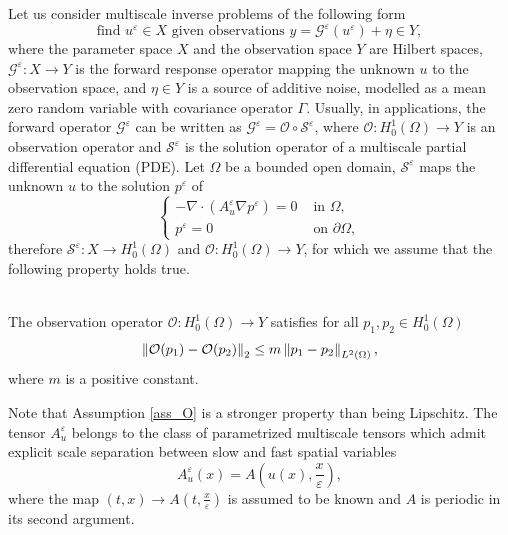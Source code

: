 \documentclass[10pt]{article}
\begin{document}
Let us consider multiscale inverse problems of the following form
\begin{equation}
\label{multiscale_inverse_problem}
\text{find } u^{\varepsilon} \in X \text{ given observations } y = \mathcal{G}^{\varepsilon}(u^{\varepsilon}) + \eta \in Y,
\end{equation}
where the parameter space $X$ and the observation space $Y$ are Hilbert spaces, $\mathcal{G}^{\varepsilon} \colon X \to Y$ is the forward response operator mapping the unknown $u$ to the observation space, and $\eta \in Y$ is a source of additive noise, modelled as a mean zero random variable with covariance operator $\Gamma$. Usually, in applications, the forward operator $\mathcal{G}^{\varepsilon}$ can be written as $\mathcal{G}^{\varepsilon} = \mathcal{O} \circ \mathcal{S}^{\varepsilon}$, where $\mathcal{O} \colon H^1_0(\Omega) \to Y$ is an observation operator and $\mathcal{S}^{\varepsilon}$ is the solution operator of a multiscale partial differential equation (PDE). Let $\Omega$ be a bounded open domain, $\mathcal{S}^{\varepsilon}$ maps the unknown $u$ to the solution $p^{\varepsilon}$ of 
\begin{equation}
\label{intro_problem_multiscale}
\begin{cases}
- \nabla \cdot ( A^{\varepsilon}_u \nabla p^{\varepsilon} ) = 0 & \text{ in } \Omega, \\
p^{\varepsilon} = 0 & \text{ on } \partial \Omega,
\end{cases}
\end{equation}
therefore $\mathcal{S}^{\varepsilon} \colon X \to H^1_0(\Omega)$ and $\mathcal{O} \colon H^1_0(\Omega) \to Y$, for which we assume that the following property holds true.
\begin{assumption}
\label{ass_O}
\leavevmode \\
The observation operator $\mathcal{O} \colon H^1_0(\Omega) \to Y$ satisfies for all $p_1, p_2 \in H^1_0(\Omega)$
\[ \left\|\mathcal{O}(p_1) - \mathcal{O}(p_2)\right\|_2 \le m \left\|p_1 - p_2\right\|_{L^2(\Omega)}, \]
where $m$ is a positive constant.
\end{assumption}
Note that Assumption \ref{ass_O} is a stronger property than being Lipschitz.
The tensor $A^{\varepsilon}_u$ belongs to the class of parametrized multiscale tensors which admit explicit scale separation between slow and fast spatial variables
\begin{equation*}
A^{\varepsilon}_u(x) = A \left ( u(x), \frac{x}{\varepsilon} \right ),
\end{equation*}
where the map $(t,x) \to A \left ( t, \frac{x}{\varepsilon} \right )$ is assumed to be known and $A$ is periodic in its second argument. \\
\end{document}
